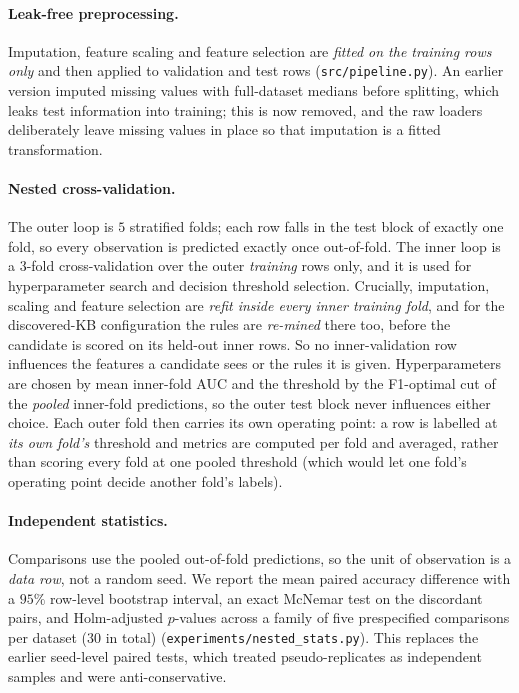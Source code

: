 \documentclass[11pt]{article}
\begin{document}
\paragraph{Leak-free preprocessing.}
Imputation, feature scaling and feature selection are \emph{fitted on the training
rows only} and then applied to validation and test rows
(\texttt{src/pipeline.py}). An earlier version imputed missing values with
full-dataset medians before splitting, which leaks test information into
training; this is now removed, and the raw loaders deliberately leave missing
values in place so that imputation is a fitted transformation.

\paragraph{Nested cross-validation.}
The outer loop is $5$ stratified folds; each row falls in the test block of
exactly one fold, so every observation is predicted exactly once out-of-fold.
The inner loop is a $3$-fold cross-validation over the outer \emph{training} rows
only, and it is used for hyperparameter search and decision threshold selection.
Crucially, imputation, scaling and feature selection are \emph{refit inside every
inner training fold}, and for the discovered-KB configuration the rules are
\emph{re-mined} there too, before the candidate is scored on its held-out inner
rows. So no inner-validation row influences the features a candidate sees or the
rules it is given. Hyperparameters are chosen by mean inner-fold AUC and the
threshold by the F1-optimal cut of the \emph{pooled} inner-fold predictions, so
the outer test block never influences either choice. Each outer fold then carries
its own operating point: a row is labelled at \emph{its own fold's} threshold and
metrics are computed per fold and averaged, rather than scoring every fold at one
pooled threshold (which would let one fold's operating point decide another
fold's labels).

\paragraph{Independent statistics.}
Comparisons use the pooled out-of-fold predictions, so the unit of observation is
a \emph{data row}, not a random seed. We report the mean paired accuracy
difference with a $95\%$ row-level bootstrap interval, an exact McNemar test on
the discordant pairs, and Holm-adjusted $p$-values across a family of five
prespecified comparisons per dataset ($30$ in total)
(\texttt{experiments/nested\_stats.py}). This replaces the earlier seed-level
paired tests, which treated pseudo-replicates as independent samples and were
anti-conservative.
\end{document}
